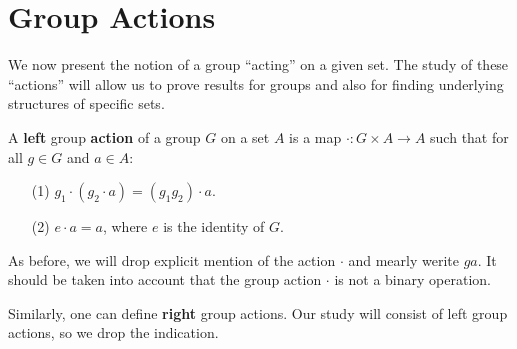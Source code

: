 \section{Group Actions}
\label{section1}

We now present the notion of a group ``acting'' on a given set. The study of
these ``actions'' will allow us to prove results for groups and also for finding
underlying structures of specific sets.

\begin{definition}
    A \textbf{left} group \textbf{action} of a group $G$ on a set  $A$ is a map
    $\cdot: G \times A
    \rightarrow A$ such that for all $g \in G$ and  $a \in A$:
    \begin{enumerate}
        \item[(1)] $g_1 \cdot (g_2 \cdot a)=(g_1g_2) \cdot a$.

        \item[(2)] $e \cdot a=a$, where  $e$ is the identity of  $G$.
    \end{enumerate}
\end{definition}
\begin{remark}
    As before, we will drop explicit mention of the action $\cdot$ and mearly
    werite $ga$. It should be taken into account that the group action $\cdot$
    is not a binary operation.
\end{remark}
\begin{remark}
    Similarly, one can define \textbf{right} group actions. Our study will
    consist of left group actions, so we drop the indication.
\end{remark}

